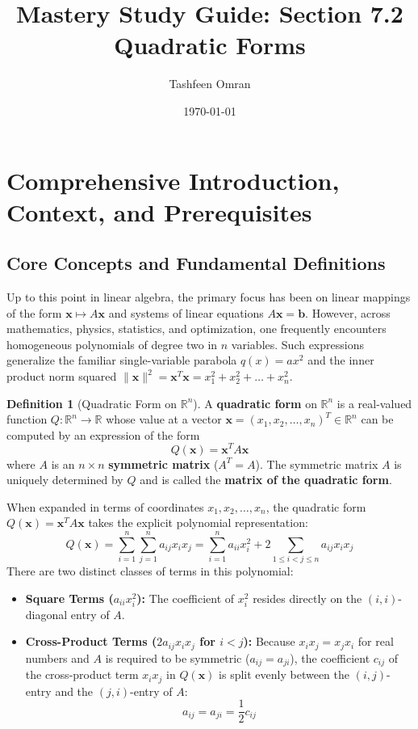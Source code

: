 \documentclass[11pt, letterpaper]{article}
\title{\textbf{Mastery Study Guide: Section 7.2 Quadratic Forms}}
\author{Tashfeen Omran}
\date{\today}
\theoremstyle{definition}
\newtheorem{definition}{Definition}[section]
\theoremstyle{remark}
\begin{document}
\maketitle
\tableofcontents
\newpage

\section{Comprehensive Introduction, Context, and Prerequisites}

\subsection{Core Concepts and Fundamental Definitions}
Up to this point in linear algebra, the primary focus has been on linear mappings of the form $\mathbf{x} \mapsto A\mathbf{x}$ and systems of linear equations $A\mathbf{x} = \mathbf{b}$. However, across mathematics, physics, statistics, and optimization, one frequently encounters homogeneous polynomials of degree two in $n$ variables. Such expressions generalize the familiar single-variable parabola $q(x) = ax^2$ and the inner product norm squared $\|\mathbf{x}\|^2 = \mathbf{x}^T\mathbf{x} = x_1^2 + x_2^2 + \dots + x_n^2$.

\begin{definition}[Quadratic Form on $\mathbb{R}^n$]
A \textbf{quadratic form} on $\mathbb{R}^n$ is a real-valued function $Q : \mathbb{R}^n \to \mathbb{R}$ whose value at a vector $\mathbf{x} = (x_1, x_2, \dots, x_n)^T \in \mathbb{R}^n$ can be computed by an expression of the form
\[
Q(\mathbf{x}) = \mathbf{x}^T A \mathbf{x}
\]
where $A$ is an $n \times n$ \textbf{symmetric matrix} ($A^T = A$). The symmetric matrix $A$ is uniquely determined by $Q$ and is called the \textbf{matrix of the quadratic form}.
\end{definition}

When expanded in terms of coordinates $x_1, x_2, \dots, x_n$, the quadratic form $Q(\mathbf{x}) = \mathbf{x}^T A \mathbf{x}$ takes the explicit polynomial representation:
\[
Q(\mathbf{x}) = \sum_{i=1}^n \sum_{j=1}^n a_{ij} x_i x_j = \sum_{i=1}^n a_{ii} x_i^2 + 2 \sum_{1 \le i < j \le n} a_{ij} x_i x_j
\]
There are two distinct classes of terms in this polynomial:
\begin{itemize}
    \item \textbf{Square Terms ($a_{ii}x_i^2$):} The coefficient of $x_i^2$ resides directly on the $(i, i)$-diagonal entry of $A$.
    \item \textbf{Cross-Product Terms ($2a_{ij}x_ix_j$ for $i < j$):} Because $x_i x_j = x_j x_i$ for real numbers and $A$ is required to be symmetric ($a_{ij} = a_{ji}$), the coefficient $c_{ij}$ of the cross-product term $x_i x_j$ in $Q(\mathbf{x})$ is split evenly between the $(i, j)$-entry and the $(j, i)$-entry of $A$:
    \[
    a_{ij} = a_{ji} = \frac{1}{2} c_{ij}
    \]
\end{itemize}
\end{document}
